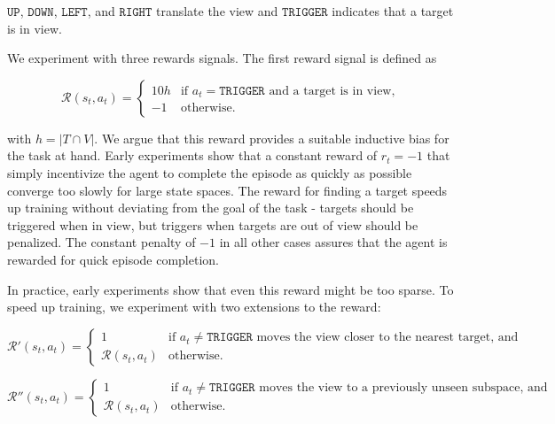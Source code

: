 \(\mathtt{UP}\), \(\mathtt{DOWN}\), \(\mathtt{LEFT}\), and \(\mathtt{RIGHT}\) translate the view and \(\mathtt{TRIGGER}\) indicates that a target is in view.

We experiment with three rewards signals.
The first reward signal is defined as

\[
    \mathcal{R}(s_t, a_t) =
    \begin{cases}
        10h & \text{if \(a_t = \mathtt{TRIGGER}\) and a target is in view,} \\
        -1  & \text{otherwise.}
    \end{cases}
\]

with \(h = \left\lvert T \cap V \right\rvert\). 
We argue that this reward provides a suitable inductive bias for the task at hand.
Early experiments show that a constant reward of \(r_t = -1\) that simply incentivize the agent to complete the episode as quickly as possible converge too slowly for large state spaces.
The reward for finding a target speeds up training without deviating from the goal of the task -
targets should be triggered when in view, but triggers when targets are out of view should be penalized.
The constant penalty of \(-1\) in all other cases assures that the agent is rewarded for quick episode completion.

In practice, early experiments show that even this reward might be too sparse.
To speed up training, we experiment with two extensions to the reward:

\[
    \mathcal{R}'(s_t, a_t) =
    \begin{cases}
        1 & \text{if \(a_t \neq \mathtt{TRIGGER}\) moves the view closer to the nearest target, and} \\
        \mathcal{R}(s_t, a_t) & \text{otherwise}.
    \end{cases}
\]

\[
    \mathcal{R}''(s_t, a_t) =
    \begin{cases}
        1 & \text{if \(a_t \neq \mathtt{TRIGGER}\) moves the view to a previously unseen subspace, and} \\
        \mathcal{R}(s_t, a_t) & \text{otherwise}.
    \end{cases}
\]

